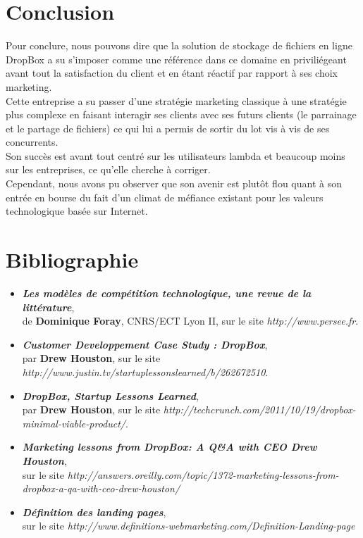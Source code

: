 \documentclass[a4paper, 10pt]{article}
\begin{document}
\section*{Conclusion}
Pour conclure, nous pouvons dire que la solution de stockage de fichiers en ligne DropBox a su s'imposer comme une référence dans ce domaine
en priviliégeant avant tout la satisfaction du client et en étant réactif par rapport à ses choix marketing.\\
Cette entreprise a su passer d'une stratégie marketing classique à une stratégie plus complexe en faisant interagir ses clients avec ses
futurs clients (le parrainage et le partage de fichiers) ce qui lui a permis de sortir du lot vis à vis de ses concurrents.\\
Son succès est avant tout centré sur les utilisateurs lambda et beaucoup moins sur les entreprises, ce qu'elle cherche à corriger.\\
Cependant, nous avons pu observer que son avenir est plutôt flou quant à son entrée en bourse du fait d'un climat de méfiance existant
pour les valeurs technologique basée sur Internet.

\newpage
\section*{Bibliographie}
\begin{itemize}
 \item \textit{\textbf{Les modèles de compétition technologique, une revue de la littérature}},\\
de \textbf{Dominique Foray}, CNRS/ECT Lyon II, sur le site \textit{http://www.persee.fr}.
 \item \textit{\textbf{Customer Developpement Case Study : DropBox}},\\
par \textbf{Drew Houston}, sur le site \textit{http://www.justin.tv/startuplessonslearned/b/262672510}.
 \item \textit{\textbf{DropBox, Startup Lessons Learned}},\\
par \textbf{Drew Houston}, sur le site \textit{http://techcrunch.com/2011/10/19/dropbox-minimal-viable-product/}.
 \item \textit{\textbf{Marketing lessons from DropBox: A Q\&A with CEO Drew Houston}},\\
sur le site \textit{http://answers.oreilly.com/topic/1372-marketing-lessons-from-dropbox-a-qa-with-ceo-drew-houston/}
 \item \textit{\textbf{Définition des landing pages}},\\
sur le site \textit{http://www.definitions-webmarketing.com/Definition-Landing-page}
\end{itemize}
\end{document}
